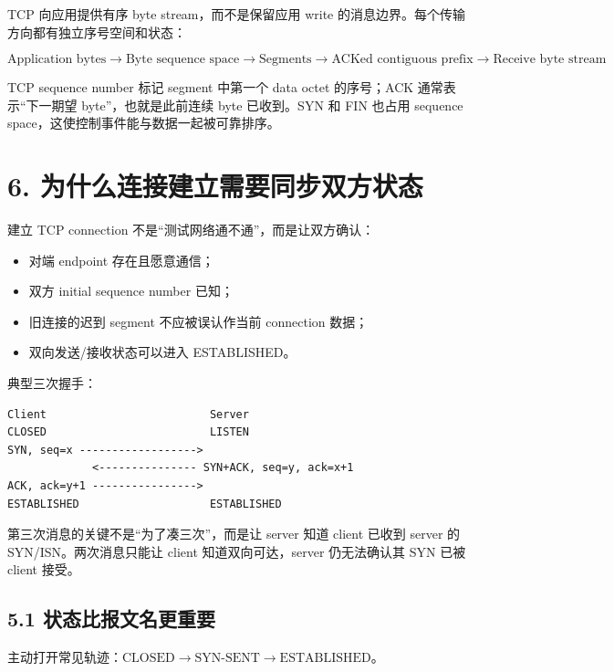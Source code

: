 \documentclass[UTF8,fontset=none,11pt,a4paper]{ctexart}
\providecommand{\tightlist}{\setlength{\itemsep}{0pt}\setlength{\parskip}{0pt}}
\begin{document}
TCP 向应用提供有序 byte stream，而不是保留应用 write
的消息边界。每个传输方向都有独立序号空间和状态：

\[
\boxed{
\text{Application bytes}
\to \text{Byte sequence space}
\to \text{Segments}
\to \text{ACKed contiguous prefix}
\to \text{Receive byte stream}
}
\]

TCP sequence number 标记 segment 中第一个 data octet 的序号；ACK
通常表示``下一期望 byte''，也就是此前连续 byte 已收到。SYN 和 FIN 也占用
sequence space，这使控制事件能与数据一起被可靠排序。

\section{6.
为什么连接建立需要同步双方状态}\label{5-ux4e3aux4ec0ux4e48ux8fdeux63a5ux5efaux7acbux9700ux8981ux540cux6b65ux53ccux65b9ux72b6ux6001}

建立 TCP connection 不是``测试网络通不通''，而是让双方确认：

\begin{itemize}
\tightlist
\item
  对端 endpoint 存在且愿意通信；
\item
  双方 initial sequence number 已知；
\item
  旧连接的迟到 segment 不应被误认作当前 connection 数据；
\item
  双向发送/接收状态可以进入 ESTABLISHED。
\end{itemize}

典型三次握手：

\begin{lstlisting}
Client                         Server
CLOSED                         LISTEN
SYN, seq=x ------------------>
             <--------------- SYN+ACK, seq=y, ack=x+1
ACK, ack=y+1 ---------------->
ESTABLISHED                    ESTABLISHED
\end{lstlisting}

第三次消息的关键不是``为了凑三次''，而是让 server 知道 client 已收到
server 的 SYN/ISN。两次消息只能让 client 知道双向可达，server
仍无法确认其 SYN 已被 client 接受。

\subsection{5.1
状态比报文名更重要}\label{51-ux72b6ux6001ux6bd4ux62a5ux6587ux540dux66f4ux91cdux8981}

主动打开常见轨迹：\(\text{CLOSED} \rightarrow \text{SYN-SENT} \rightarrow \text{ESTABLISHED}\)。
\end{document}
